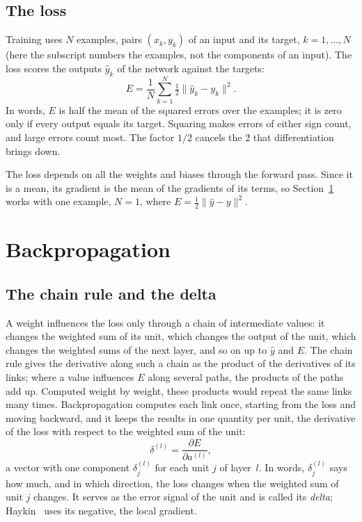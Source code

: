 \documentclass[11pt,a4paper]{amsart}
\numberwithin{equation}{section}
\theoremstyle{plain}
\theoremstyle{definition}
\theoremstyle{remark}
\newcommand{\norm}[1]{\lVert #1 \rVert}
\begin{document}
\subsection{The loss}\label{sec:loss}

Training uses $N$ examples, pairs $(x_k, y_k)$ of an input and its
target, $k = 1, \dots, N$ (here the subscript numbers the examples, not
the components of an input). The loss scores the outputs $\hat y_k$ of
the network against the targets:
\begin{equation}\label{eq:loss}
  E = \frac{1}{N} \sum_{k=1}^{N} \tfrac12 \norm{\hat y_k - y_k}^2 .
\end{equation}
In words, $E$ is half the mean of the squared errors over the examples;
it is zero only if every output equals its target. Squaring makes errors
of either sign count, and large errors count most. The factor $1/2$
cancels the $2$ that differentiation brings down.

The loss depends on all the weights and biases through the forward
pass. Since it is a mean, its gradient is the mean of the gradients of
its terms, so Section~\ref{sec:backprop} works with one example,
$N = 1$, where $E = \tfrac12 \norm{\hat y - y}^2$.

\section{Backpropagation}\label{sec:backprop}

\subsection{The chain rule and the delta}\label{sec:delta}

A weight influences the loss only through a chain of intermediate
values: it changes the weighted sum of its unit, which changes the
output of the unit, which changes the weighted sums of the next layer,
and so on up to $\hat y$ and $E$. The chain rule gives the derivative
along such a chain as the product of the derivatives of its links; where
a value influences $E$ along several paths, the products of the paths
add up. Computed weight by weight, these products would repeat the same
links many times. Backpropagation computes each link once, starting from
the loss and moving backward, and it keeps the results in one quantity
per unit, the derivative of the loss with respect to the weighted sum of
the unit:
\begin{equation}\label{eq:delta}
  \delta^{(l)} = \frac{\partial E}{\partial a^{(l)}} ,
\end{equation}
a vector with one component $\delta^{(l)}_j$ for each unit $j$ of
layer~$l$. In words, $\delta^{(l)}_j$ says how much, and in which
direction, the loss changes when the weighted sum of unit $j$ changes.
It serves as the error signal of the unit and is called its
\emph{delta}; Haykin~\cite{haykin1998} uses its negative, the local
gradient.
\end{document}
